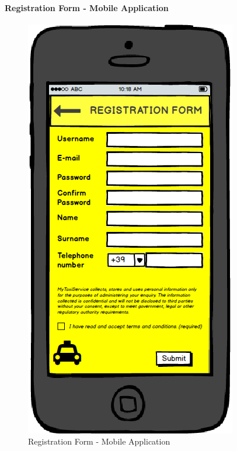 		\paragraph{Registration Form - Mobile Application}
		\begin{figure}[!h]
			\begin{center}
				\includegraphics[scale=0.5]{../SE2_MOCKUPS/MobileAppRegistrationForm.png}
				\caption{Registration Form - Mobile Application}	
			\end{center}
		\end{figure}
		\newpage
